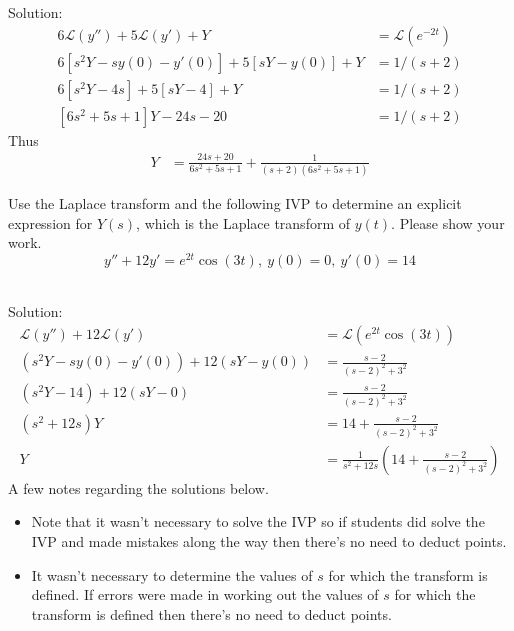     \ifnum {} {\color{DarkBlue} Solution:
    \begin{align}
        6\mathcal L(y'') + 5\mathcal L(y')+Y &= \mathcal L(e^{-2t})\\ 
        6[s^2 Y - sy(0) - y'(0)]+5[sY - y(0)]+Y &= 1/(s+2) \\
        6[s^2 Y - 4s] + 5[sY - 4] + Y &= 1/(s+2)\\
        [6s^2 + 5s + 1]Y  -  24s  -  20 &= 1/(s+2)
    \end{align}
    Thus 
    \begin{align}
        Y &= \frac{24s + 20}{6s^2 + 5s + 1} + \frac{1}{(s+2)(6s^2 + 5s + 1)}
    \end{align}        
    } 
    \else 
    \vfill
    \fi                

\fi


\ifnum {}
    \question[6] Use the Laplace transform and the following IVP to determine an explicit expression for $Y(s)$, which is the Laplace transform of $y(t)$. Please show your work. 
    $$y''+ 12y'  = e^{2t}\cos(3t), \ y(0) = 0, \ y'(0) = 14$$
    \ifnum {} {\color{DarkBlue} \\ Solution:
    \begin{align}
        \mathcal L(y'') + 12\mathcal L(y') &= \mathcal{L}(e^{2t}\cos(3t))\\ 
        (s^2 Y - sy(0) - y'(0)) + 12(sY - y(0))  &= \frac{s-2}{(s-2)^2 + 3^2} \\
        (s^2 Y - 14) + 12(sY - 0)  &= \frac{s-2}{(s-2)^2 + 3^2} \\
        (s^2 + 12s )Y  &= 14 + \frac{s-2}{(s-2)^2 + 3^2} \\
        Y &= \frac{1}{s^2 + 12s } \left( 14 + \frac{s-2}{(s-2)^2 + 3^2} \right) 
    \end{align} 
    A few notes regarding the solutions below. 
    \begin{itemize}
        \item  Note that it wasn't necessary to solve the IVP so if students did solve the IVP and made mistakes along the way then there's no need to deduct points. 
        \item It wasn't necessary to determine the values of $s$ for which the transform is defined. If errors were made in working out the values of $s$ for which the transform is defined then there's no need to deduct points. 
    \end{itemize}
    } 
    \else 
    \vfill
    \fi         
\fi



